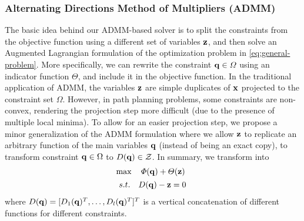 \documentclass[journal]{IEEEtran}  %
\def\sZ{\mathcal{Z}}
\begin{document}
\subsubsection{Alternating Directions Method of Multipliers (ADMM)}\label{chapter:ADMM review}
The basic idea behind our ADMM-based solver \cite{yang2020multi} is to split the constraints from the objective function using a different set of variables $\mathbf{z}$, and then solve an Augmented Lagrangian formulation of the optimization problem in \eqref{eq:general-problem}.
More specifically, we can rewrite the constraint $\mathbf{q}\in\varOmega$ using an indicator function $\varTheta$, and include it in the objective function. 
In the traditional application of ADMM, the variables $\mathbf{z}$ are simple duplicates of $\mathbf{x}$ projected to the constraint set $\Omega$. However, in path planning problems, some constraints are non-convex, rendering the projection step more difficult (due to the presence of multiple local minima).
To allow for an easier projection step, we propose a minor generalization of the ADMM formulation where we allow $\mathbf{z}$ to replicate an arbitrary function of the main variables $\mathbf{q}$ (instead of being an exact copy), to transform constraint $\mathbf{q}\in\Omega$ to $D(\vq) \in \sZ$. In summary, we transform  into
\begin{equation}\label{eq:ADMMSetConstraint_modified}
	\begin{aligned}
		&\max\quad \varPhi(\vq)+\varTheta(\vz) \\
		& \begin{array}{r@{\quad}c}
			s.t.& D(\vq)-\vz=0
		\end{array} 
	\end{aligned}
\end{equation}
where $D(\mathbf{q})= [D_1(\mathbf{q})^T,\dots,D_l(\mathbf{q})^T]^T$ is a vertical concatenation of different functions for different constraints.
\end{document}
